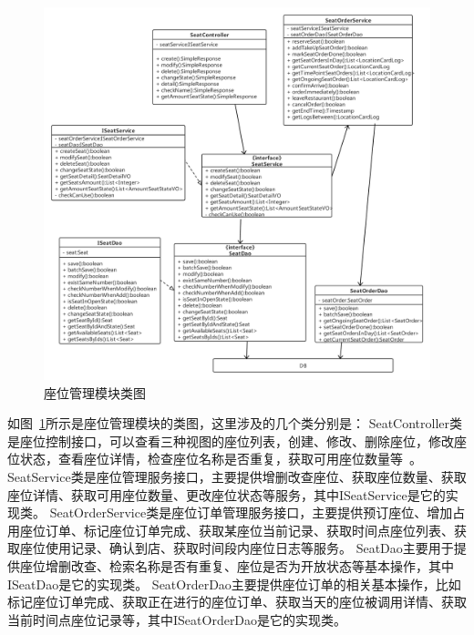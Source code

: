 \begin{figure}[htbp!]
    \centering
    \includegraphics[width=\linewidth]{FIGs/chapter4/seat.pdf}
    \caption{座位管理模块类图}\label{fig_seat}
\end{figure}

如图~\ref{fig_seat}所示是座位管理模块的类图，这里涉及的几个类分别是：
SeatController类是座位控制接口，可以查看三种视图的座位列表，创建、修改、删除座位，修改座位状态，查看座位详情，检查座位名称是否重复，获取可用座位数量等~\cite{qjh2019}。
SeatService类是座位管理服务接口，主要提供增删改查座位、获取座位数量、获取座位详情、获取可用座位数量、更改座位状态等服务，其中ISeatService是它的实现类。
SeatOrderService类是座位订单管理服务接口，主要提供预订座位、增加占用座位订单、标记座位订单完成、获取某座位当前记录、获取时间点座位列表、获取座位使用记录、确认到店、获取时间段内座位日志等服务。
SeatDao主要用于提供座位增删改查、检索名称是否有重复、座位是否为开放状态等基本操作，其中ISeatDao是它的实现类。
SeatOrderDao主要提供座位订单的相关基本操作，比如标记座位订单完成、获取正在进行的座位订单、获取当天的座位被调用详情、获取当前时间点座位记录等，其中ISeatOrderDao是它的实现类。\\

